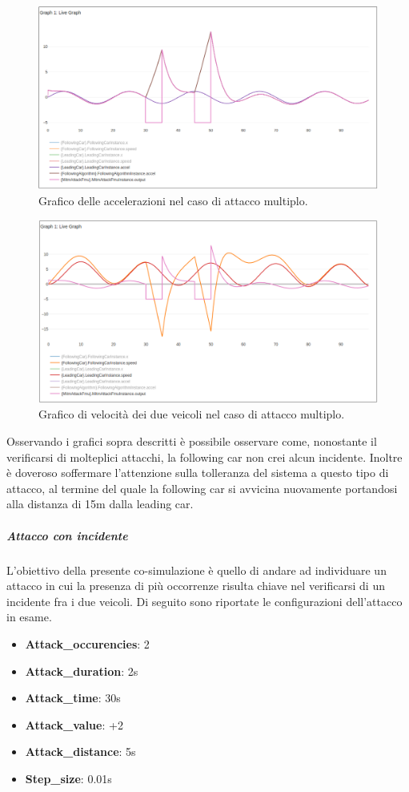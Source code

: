 \begin{figure}[H]
	\centering
	\includegraphics[width=\textwidth]{img/MultiAttackAccelPlotAccelNoCrash.png}
	\caption{Grafico delle accelerazioni nel caso di attacco multiplo.}
\end{figure}
\begin{figure}[H]
	\centering
	\includegraphics[width=\textwidth]{img/MultiAttackAccelPlotSpeedNoCrash.png}
	\caption{Grafico di velocità dei due veicoli nel caso di attacco multiplo.}
\end{figure}

Osservando i grafici sopra descritti è possibile osservare come, nonostante il verificarsi di molteplici attacchi, la following car non crei alcun incidente. Inoltre è doveroso soffermare l'attenzione sulla tolleranza del sistema a questo tipo di attacco, al termine del quale la following car si avvicina nuovamente portandosi alla distanza di 15m dalla leading car.

\subparagraph{Attacco con incidente}
L'obiettivo della presente co-simulazione è quello di andare ad individuare un attacco in cui la presenza di più occorrenze risulta chiave nel verificarsi di un incidente fra i due veicoli. Di seguito sono riportate le configurazioni dell'attacco in esame.
\begin{itemize}
\item \textbf{Attack\_occurencies}: 2
\item \textbf{Attack\_duration}: 2s
\item \textbf{Attack\_time}: 30s
\item \textbf{Attack\_value}: +2
\item \textbf{Attack\_distance}: 5s
\item \textbf{Step\_size}: 0.01s
\end{itemize}

